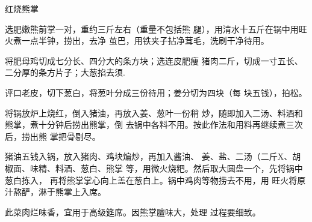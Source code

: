 \begin{recipe}{红烧熊掌}

\ingredients


\cooking

\step 选肥嫩熊前掌一对，重约三斤左右（重量不包括熊 腿），用清水十五斤在锅中用旺火煮一点半钟，捞出，去净 茧巴，用铁夹子拈净茸毛，洗刷干净待用。

\step 将肥母鸡切成七分长、四分大的条方块；选连皮肥瘦 猪肉二斤，切成一寸五长、二分厚的条方片子；大葱掐去须.

评口老皮，切下葱白，将葱叶分成三份待用；姜分切为四块（每 块五钱），拍松。

\step 将锅放炉上烧红，倒入猪油，再放入姜、葱叶一份稍 炒，随即加入二汤、料酒和熊掌，煮十分钟后捞出熊掌，倒 去锅中各料不用。按此作法和用料再继续煮三次后，捞出熊 掌把骨剔尽。

\step 猪油五钱入锅，放入猪肉、鸡块煸炒，再加入酱油、 姜、盐、二汤（二斤X、胡椒面、味精、料酒、葱白、熊掌 等，用微火烧粑。然后取大圆盘一个，先将锅中葱白拣入， 再将熊掌掌心向上盖在葱白上。锅中鸡肉等物捞去不用，用 旺火将原汁熬酽，淋于熊掌上入席。

\notes

此菜肉烂味香，宜用于高级筵席。因熊掌膻味大，处理 过程要细致。

\end{recipe}

